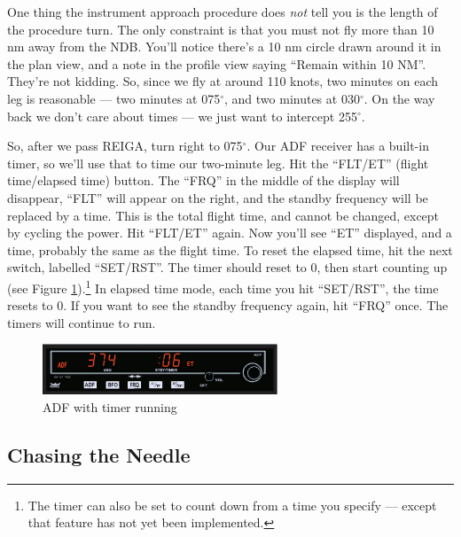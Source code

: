 One thing the instrument approach procedure does \emph{not} tell you
is the length of the procedure turn.  The only constraint is that you
must not fly more than 10 nm away from the NDB.  You'll notice there's
a 10 nm circle drawn around it in the plan view, and a note in the
profile view saying ``Remain within 10 NM''.  They're not kidding.
So, since we fly at around 110 knots, two minutes on each leg is
reasonable --- two minutes at 075$^\circ$, and two minutes at
030$^\circ$.  On the way back we don't care about times --- we just
want to intercept 255$^\circ$.

So, after we pass REIGA, turn right to 075$^\circ$.  Our ADF receiver
has a built-in timer, so we'll use that to time our two-minute leg.
Hit the ``FLT/ET'' (flight time/elapsed time) button.  The ``FRQ'' in
the middle of the display will disappear, ``FLT'' will appear on the
right, and the standby frequency will be replaced by a time.  This is
the total flight time, and cannot be changed, except by cycling the
power.  Hit ``FLT/ET'' again.  Now you'll see ``ET'' displayed, and a
time, probably the same as the flight time.  To reset the elapsed
time, hit the next switch, labelled ``SET/RST''.  The timer should
reset to 0, then start counting up (see Figure
\ref{fig:ADF}).\footnote{The timer can also be set to count down from
  a time you specify --- except that feature has not yet been
  implemented.}  In elapsed time mode, each time you hit ``SET/RST'',
the time resets to 0.  If you want to see the standby frequency again,
hit ``FRQ'' once.  The timers will continue to run.

\begin{figure}
  \begin{center}
    \includegraphics[width=7cm]{img/ADF}
    \caption{ADF with timer running}
    \label{fig:ADF}
  \end{center}
\end{figure}

\subsection{Chasing the Needle}


